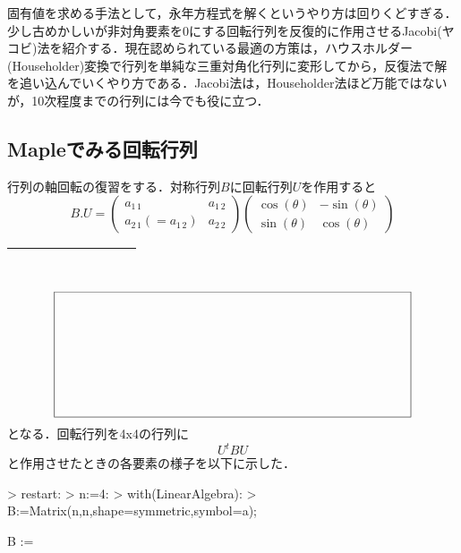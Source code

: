 固有値を求める手法として，永年方程式を解くというやり方は回りくどすぎる．少し古めかしいが非対角要素を0にする回転行列を反復的に作用させるJacobi(ヤコビ)法を紹介する．現在認められている最適の方策は，ハウスホルダー(Householder)変換で行列を単純な三重対角化行列に変形してから，反復法で解を追い込んでいくやり方である．Jacobi法は，Householder法ほど万能ではないが，10次程度までの行列には今でも役に立つ．

\subsection{Mapleでみる回転行列}
行列の軸回転の復習をする．対称行列$B$に回転行列$U$を作用すると
\begin{equation}
B.U =  
\left(
\begin{array}{cc}
{a_{1\,1}} & {a_{1\,2}}\\
{a_{2\,1}(={a_{1\,2}})} & {a_{2\,2}}
\end{array}
 \right)
\left( 
\begin{array}{cc}
\cos(\theta) &  -\sin(\theta)\\
\sin(\theta) & \cos(\theta)
\end{array}
 \right) 
\end{equation}

\ifHIKI
\begin{tabular}{|c|}
\hline
　　　　　　　　 \\ 
\hline
\end{tabular}
\else
\begin{equation*}
\setlength{\unitlength}{1cm}
\begin{picture}(10,3.5)
\put(0,0){\framebox(10,3.5){}}
\end{picture}
\end{equation*}
\fi
となる．回転行列を4x4の行列に
\begin{equation}
U^t B U
\end{equation}
と作用させたときの各要素の様子を以下に示した．
\begin{MapleInput}
> restart:
> n:=4:
> with(LinearAlgebra):
> B:=Matrix(n,n,shape=symmetric,symbol=a);
\end{MapleInput}

\begin{MapleOutput}
B :=   
\end{MapleOutput}

